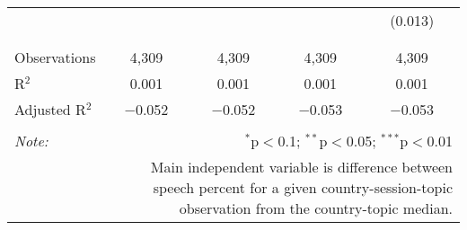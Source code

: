 \begin{table}[!htbp]
\begin{tabular}{@{\extracolsep{5pt}}lcccc}
  &  &  &  & (0.013) \\ 
  & & & & \\ 
\hline \\[-1.8ex] 
Observations & 4,309 & 4,309 & 4,309 & 4,309 \\ 
R$^{2}$ & 0.001 & 0.001 & 0.001 & 0.001 \\ 
Adjusted R$^{2}$ & $-$0.052 & $-$0.052 & $-$0.053 & $-$0.053 \\ 
\hline 
\hline \\[-1.8ex] 
\textit{Note:}  & \multicolumn{4}{r}{$^{*}$p$<$0.1; $^{**}$p$<$0.05; $^{***}$p$<$0.01} \\ 
 & \multicolumn{4}{r}{Main independent variable is difference between speech percent for a given country-session-topic observation from the country-topic median.} \\ 
\end{tabular} 
\end{table} 
